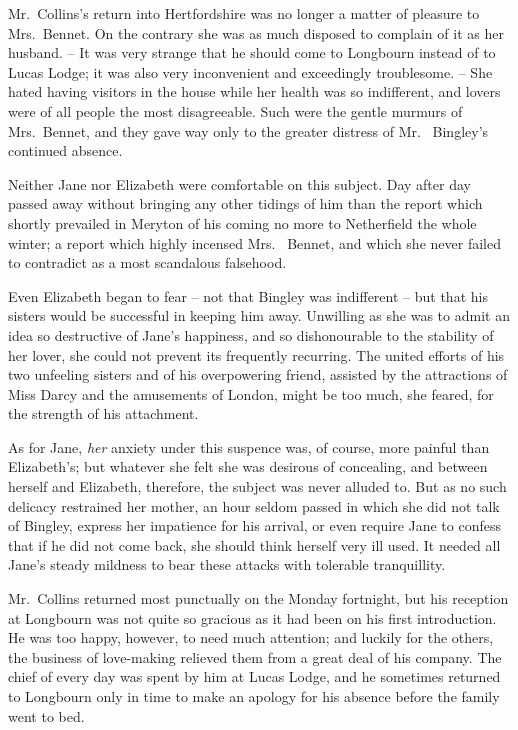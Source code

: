 Mr.\ Collins’s return into Hertfordshire was no longer
a matter of pleasure to Mrs.\ Bennet. On the contrary
she was as much disposed to complain of it as her
husband. -- It was very strange that he should come to
Longbourn instead of to Lucas Lodge; it was also very
inconvenient and exceedingly troublesome. -- She hated
having visitors in the house while her health was so
indifferent, and lovers were of all people the most disagreeable.
Such were the gentle murmurs of Mrs.\ Bennet,
and they gave way only to the greater distress of Mr.\ %
Bingley’s continued absence.

Neither Jane nor Elizabeth were comfortable on this
subject. Day after day passed away without bringing
any other tidings of him than the report which shortly
prevailed in Meryton of his coming no more to Netherfield
the whole winter; a report which highly incensed Mrs.\ %
Bennet, and which she never failed to contradict as a most
scandalous falsehood.

Even Elizabeth began to fear -- not that Bingley was
indifferent -- but that his sisters would be successful in
keeping him away. Unwilling as she was to admit an
idea so destructive of Jane’s happiness, and so dishonourable
to the stability of her lover, she could not prevent
its frequently recurring. The united efforts of his two
unfeeling sisters and of his overpowering friend, assisted
by the attractions of Miss Darcy and the amusements
of London, might be too much, she feared, for the strength
of his attachment.

As for Jane, \textit{her} anxiety under this suspence was, of
course, more painful than Elizabeth’s; but whatever she
felt she was desirous of concealing, and between herself
and Elizabeth, therefore, the subject was never alluded to.
But as no such delicacy restrained her mother, an hour
seldom passed in which she did not talk of Bingley, express
her impatience for his arrival, or even require Jane to
confess that if he did not come back, she should think
herself very ill used. It needed all Jane’s steady mildness
to bear these attacks with tolerable tranquillity.

Mr.\ Collins returned most punctually on the Monday
fortnight, but his reception at Longbourn was not quite
so gracious as it had been on his first introduction. He
was too happy, however, to need much attention; and
luckily for the others, the business of love-making relieved
them from a great deal of his company. The chief of
every day was spent by him at Lucas Lodge, and he
sometimes returned to Longbourn only in time to make
an apology for his absence before the family went to bed.

